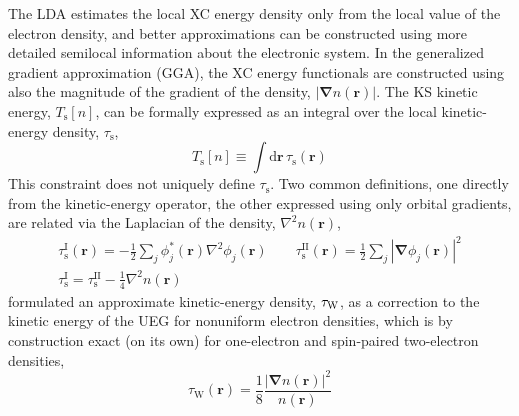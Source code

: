 The LDA estimates the local XC energy density only from the local value of the electron density, and better approximations can be constructed using more detailed semilocal information about the electronic system.
In the generalized gradient approximation (GGA), the XC energy functionals are constructed using also the magnitude of the gradient of the density, $|\boldsymbol\nabla n(\mathbf r)|$.
The KS kinetic energy, $T_\text{s}[n]$, can be formally expressed as an integral over the local kinetic-energy density, $\tau_\text{s}$,
\begin{equation}
  T_\text{s}[n]\equiv\int\mathrm d\mathbf r\,\tau_\text{s}(\mathbf r)
\end{equation}
This constraint does not uniquely define $\tau_\text{s}$.
Two common definitions, one directly from the kinetic-energy operator, the other expressed using only orbital gradients, are related via the Laplacian of the density, $\nabla^2n(\mathbf r)$,
\begin{equation}
\begin{gathered}
  \tau_\text{s}^\text{I}(\mathbf r)=-\frac12\sum_j\phi_j^*(\mathbf r)\nabla^2\phi_j(\mathbf r)\qquad
  \tau_\text{s}^\text{II}(\mathbf r)=\frac12\sum_j|\boldsymbol\nabla\phi_j(\mathbf r)|^2 \\
  \tau_\text{s}^\text{I}=\tau_\text{s}^\text{II}-\tfrac14\nabla^2n(\mathbf r)
\end{gathered}\label{eq:kinetic}
\end{equation}
\citet{vonWeizsackerZFP35} formulated an approximate kinetic-energy density, $\tau_\text W$, as a correction to the kinetic energy of the UEG for nonuniform electron densities, which is by construction exact (on its own) for one-electron and spin-paired two-electron densities,
\begin{equation}
  \tau_\text{W}(\mathbf r)=\frac18\frac{|\boldsymbol\nabla n(\mathbf r)|^2}{n(\mathbf r)}
  \label{eq:von-w}
\end{equation}

